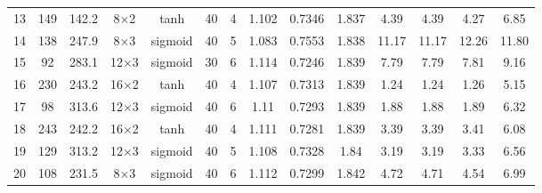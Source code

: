 \begin{tabular}{lcc cccc ccccccc}
  13 & 149 & 142.2 & 8$\times$2 & tanh & 40 & 4 & \num{1.102} & \num{0.7346} & \num{1.837} & 4.39 & 4.39 & 4.27 & 6.85 \\
  14 & 138 & 247.9 & 8$\times$3 & sigmoid & 40 & 5 & \num{1.083} & \num{0.7553} & \num{1.838} & 11.17 & 11.17 & 12.26 & 11.80 \\
  15 & 92 & 283.1 & 12$\times$3 & sigmoid & 30 & 6 & \num{1.114} & \num{0.7246} & \num{1.839} & 7.79 & 7.79 & 7.81 & 9.16 \\
  16 & 230 & 243.2 & 16$\times$2 & tanh & 40 & 4 & \num{1.107} & \num{0.7313} & \num{1.839} & 1.24 & 1.24 & 1.26 & 5.15 \\
  17 & 98 & 313.6 & 12$\times$3 & sigmoid & 40 & 6 & \num{1.11} & \num{0.7293} & \num{1.839} & 1.88 & 1.88 & 1.89 & 6.32 \\
  18 & 243 & 242.2 & 16$\times$2 & tanh & 40 & 4 & \num{1.111} & \num{0.7281} & \num{1.839} & 3.39 & 3.39 & 3.41 & 6.08 \\
  19 & 129 & 313.2 & 12$\times$3 & sigmoid & 40 & 5 & \num{1.108} & \num{0.7328} & \num{1.84} & 3.19 & 3.19 & 3.33 & 6.56 \\
  20 & 108 & 231.5 & 8$\times$3 & sigmoid & 40 & 6 & \num{1.112} & \num{0.7299} & \num{1.842} & 4.72 & 4.71 & 4.54 & 6.99 \\
\bottomrule
\end{tabular}
